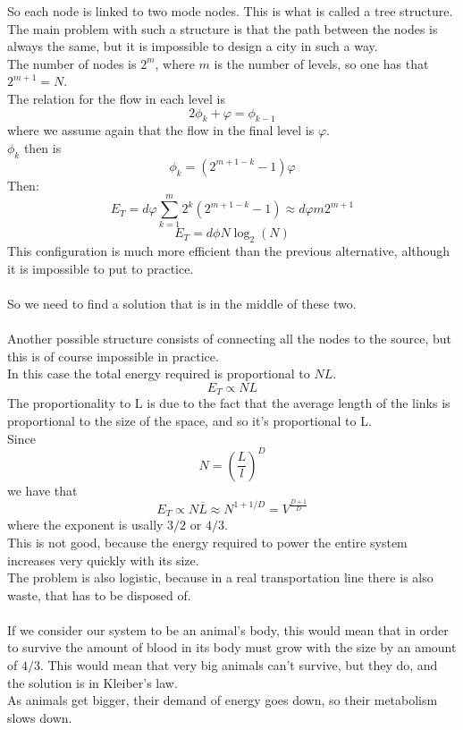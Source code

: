 So each node is linked to two mode nodes. This is what is called a tree structure. \\
The main problem with such a structure is that the path between the nodes is always the same, but it is impossible to design a city in such a way. \\
The number of nodes is $2^m$, where $m$ is the number of levels, so one has that $2^{m+1} = N$. \\
The relation for the flow in each level is
$$
	2\phi_k + \varphi = \phi_{k-1}
$$
where we assume again that the flow in the final level is $\varphi$. \\
$\phi_k$ then is
$$
	\phi_k = (2^{m+1-k}-1)\varphi
$$
Then:
$$
	E_T = d\varphi\sum_{k=1}^m 2^k(2^{m+1-k}-1) \approx d\varphi m 2^{m+1}	
$$
$$
	E_T = d\phi N \log_2(N)
$$
This configuration is much more efficient than the previous alternative, although it is impossible to put to practice. \\ \\ 
So we need to find a solution that is in the middle of these two. \\ \\
Another possible structure consists of connecting all the nodes to the source, but this is of course impossible in practice. \\
In this case the total energy required is proportional to $NL$. 
$$
	E_T \propto NL
$$
The proportionality to L is due to the fact that the average length of the links is proportional to the size of the space, and so it's proportional to L. \\
Since 
$$
	N = \left(\frac{L}{l} \right)^D
$$
we have that
$$
	E_T \propto N\overline{L} \approx N^{1+1/D} = V^{\frac{D+1}{D}}
$$
where the exponent is usally $3/2$ or $4/3$. \\
This is not good, because the energy required to power the entire system increases very quickly with its size. \\
The problem is also logistic, because in a real transportation line there is also waste, that has to be disposed of. \\ \\
If we consider our system to be an animal's body, this would mean that in order to survive the amount of blood in its body must grow with the size by an amount of $4/3$. This would mean that very big animals can't survive, but they do, and the solution is in Kleiber's law. \\
As animals get bigger, their demand of energy goes down, so their metabolism slows down.  



